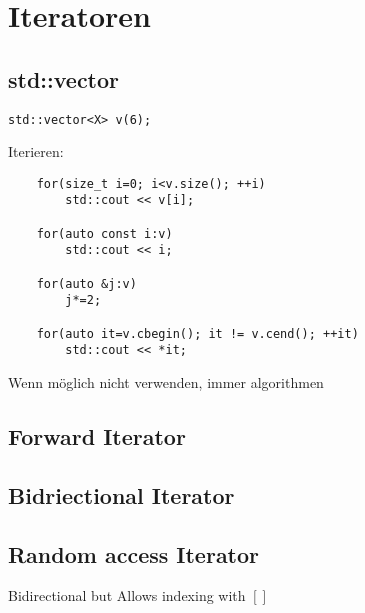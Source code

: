 \section{Iteratoren}
\subsection{std::vector}
\begin{lstlisting}
std::vector<X> v(6);
\end{lstlisting}
Iterieren:
\begin{lstlisting}
	for(size_t i=0; i<v.size(); ++i)
		std::cout << v[i];
	
	for(auto const i:v)
		std::cout << i;
	
	for(auto &j:v)
		j*=2;

	for(auto it=v.cbegin(); it != v.cend(); ++it)
		std::cout << *it;
\end{lstlisting}
Wenn möglich nicht verwenden, immer algorithmen

\subsection{Forward Iterator}

\subsection{Bidriectional Iterator}

\subsection{Random access Iterator}
Bidirectional but Allows indexing with $[]$


